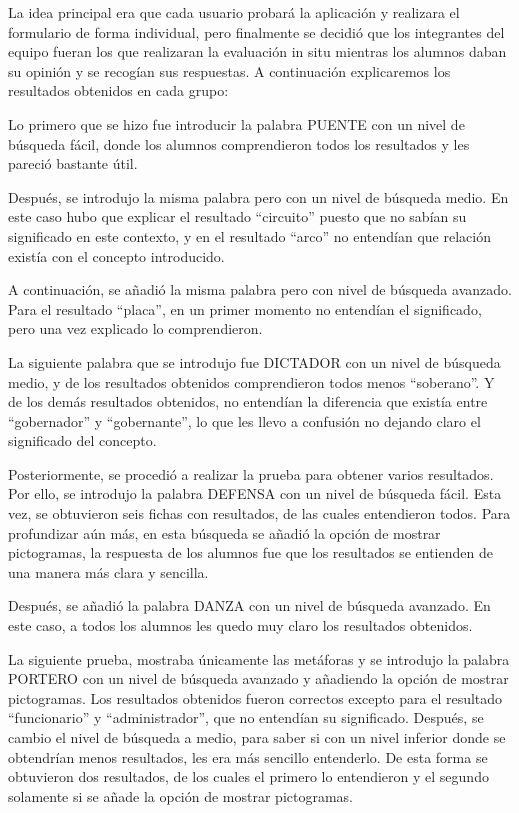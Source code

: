 La idea principal era que cada usuario probará la aplicación y realizara el formulario de forma individual, pero finalmente se decidió que los integrantes del equipo fueran los que realizaran la evaluación in situ mientras los alumnos daban su opinión y se recogían sus respuestas.
A continuación explicaremos los resultados obtenidos en cada grupo:

Lo primero que se hizo fue introducir la palabra PUENTE con un nivel de búsqueda fácil, donde los alumnos comprendieron todos los resultados y les pareció bastante útil.

Después, se introdujo la misma palabra pero con un nivel de búsqueda medio. En este caso hubo que explicar el resultado ``circuito'' puesto que no sabían su significado en este contexto, y en el resultado ``arco''  no entendían que relación existía con el concepto introducido.

A continuación, se añadió la misma palabra pero con nivel de búsqueda avanzado. Para el resultado  ``placa'', en un primer momento no entendían el significado, pero una vez explicado lo comprendieron.

La siguiente palabra que se introdujo fue DICTADOR con un nivel de búsqueda medio, y de los resultados obtenidos comprendieron todos menos ``soberano''. Y de los demás resultados obtenidos, no entendían la diferencia que existía entre ``gobernador'' y ``gobernante'', lo que les llevo a confusión no dejando claro el significado del concepto.

Posteriormente, se procedió a realizar la prueba para obtener varios resultados. Por ello, se introdujo la palabra DEFENSA con un nivel de búsqueda fácil. Esta vez, se obtuvieron seis fichas con resultados, de las cuales entendieron todos. Para profundizar aún más, en esta búsqueda se añadió la opción de mostrar pictogramas, la respuesta de los alumnos fue que los resultados se entienden de una manera más clara y sencilla.

Después, se añadió la palabra DANZA con un nivel de búsqueda avanzado. En este caso, a todos los alumnos les quedo muy claro los resultados obtenidos.

La siguiente prueba, mostraba únicamente las metáforas y se introdujo la palabra PORTERO con un nivel de búsqueda avanzado y añadiendo la opción de mostrar pictogramas. Los resultados obtenidos fueron correctos excepto para el resultado ``funcionario'' y ``administrador'', que no entendían su significado. Después, se cambio el nivel de búsqueda a medio, para saber si con un nivel inferior donde se obtendrían menos resultados, les era más sencillo entenderlo. De esta forma se obtuvieron dos resultados, de los cuales el primero lo entendieron y el segundo solamente si se añade la opción de mostrar pictogramas.


